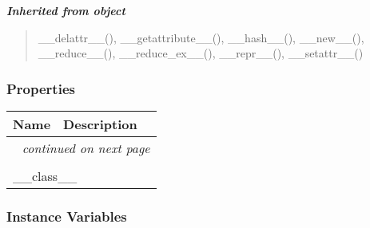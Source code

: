 \large{\textbf{\textit{Inherited from object}}}

\begin{quote}
\_\_delattr\_\_(), \_\_getattribute\_\_(), \_\_hash\_\_(), \_\_new\_\_(), \_\_reduce\_\_(), \_\_reduce\_ex\_\_(), \_\_repr\_\_(), \_\_setattr\_\_()
\end{quote}


  \subsubsection{Properties}

    \vspace{-1cm}
\hspace{\varindent}\begin{longtable}{|p{\varnamewidth}|p{\vardescrwidth}|l}
\cline{1-2}
\cline{1-2} \centering \textbf{Name} & \centering \textbf{Description}& \\
\cline{1-2}
\endhead\cline{1-2}\multicolumn{3}{r}{\small\textit{continued on next page}}\\\endfoot\cline{1-2}
\endlastfoot\multicolumn{2}{|l|}{\textit{Inherited from object}}\\
\multicolumn{2}{|p{\varwidth}|}{\raggedright \_\_class\_\_}\\
\cline{1-2}
\end{longtable}



  \subsubsection{Instance Variables}

